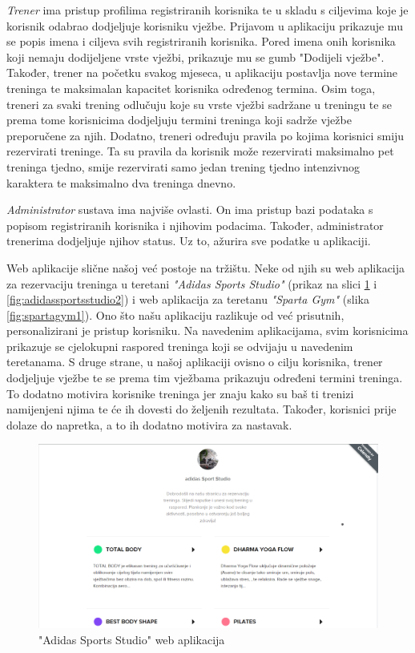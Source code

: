 		{\textit {Trener} ima pristup profilima registriranih korisnika te u skladu s ciljevima koje je korisnik odabrao dodjeljuje korisniku vježbe. Prijavom u aplikaciju prikazuje mu se popis imena i ciljeva svih registriranih korisnika. Pored imena onih korisnika koji nemaju dodijeljene vrste vježbi, prikazuje mu se gumb "Dodijeli vježbe". Također, trener na početku svakog mjeseca, u aplikaciju postavlja nove termine treninga te maksimalan kapacitet korisnika određenog termina. Osim toga, treneri za svaki trening odlučuju koje su vrste vježbi sadržane u treningu te se prema tome korisnicima dodjeljuju termini treninga koji sadrže vježbe preporučene za njih. Dodatno, treneri određuju pravila po kojima korisnici smiju rezervirati treninge. Ta su pravila da korisnik može rezervirati maksimalno pet treninga tjedno, smije rezervirati samo jedan trening tjedno intenzivnog karaktera te maksimalno dva treninga dnevno.}
		
		{\textit {Administrator} sustava ima najviše ovlasti. On ima pristup bazi podataka s popisom registriranih korisnika i njihovim podacima. Također, administrator trenerima dodjeljuje njihov status. Uz to, ažurira sve podatke u aplikaciji. }
		
		
		{Web aplikacije slične našoj već postoje na tržištu. Neke od njih su web aplikacija za rezervaciju treninga u teretani \textit{"Adidas Sports Studio"} (prikaz na slici \ref {fig:adidassportsstudio1} i \ref{fig:adidassportsstudio2}) i web aplikacija za teretanu \textit{"Sparta Gym"} (slika \ref{fig:spartagym1}). Ono što našu aplikaciju razlikuje od već prisutnih, personalizirani je pristup korisniku. Na navedenim aplikacijama, svim korisnicima prikazuje se cjelokupni raspored treninga koji se odvijaju u navedenim teretanama. S druge strane, u našoj aplikaciji ovisno o cilju korisnika, trener dodjeljuje vježbe te se prema tim vježbama prikazuju određeni termini treninga. To dodatno motivira korisnike treninga jer znaju kako su baš ti trenizi namijenjeni njima te će ih dovesti do željenih rezultata. Također, korisnici prije dolaze do napretka, a to ih dodatno motivira za nastavak.} 
		
		
		\begin{figure}[H]
			\includegraphics[scale=0.3]{slike/adidassportsstudio1.PNG} %
			\centering
			\caption{"Adidas Sports Studio" web aplikacija}
			\label{fig:adidassportsstudio1}
		\end{figure}
		
